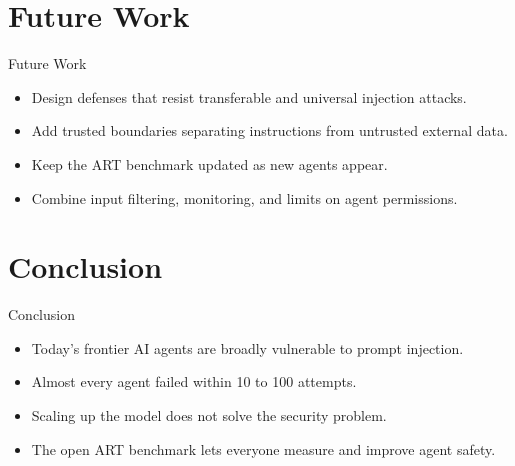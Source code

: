 \documentclass[10pt]{beamer}
\begin{document}
\section{Future Work}
\begin{frame}{Future Work}
\begin{itemize}
  \item Design defenses that resist transferable and universal injection attacks.
  \item Add trusted boundaries separating instructions from untrusted external data.
  \item Keep the ART benchmark updated as new agents appear.
  \item Combine input filtering, monitoring, and limits on agent permissions.
\end{itemize}
\end{frame}
\section{Conclusion}
\begin{frame}{Conclusion}
\begin{itemize}
  \item Today's frontier AI agents are broadly vulnerable to prompt injection.
  \item Almost every agent failed within 10 to 100 attempts.
  \item Scaling up the model does not solve the security problem.
  \item The open ART benchmark lets everyone measure and improve agent safety.
\end{itemize}
\end{frame}
\end{document}
